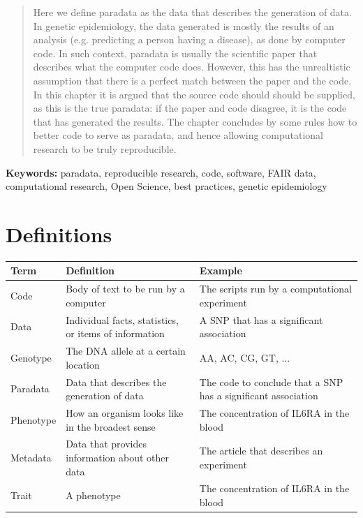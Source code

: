 \begin{abstract}

Here we define paradata as the data that describes the generation of data.
In genetic epidemiology, the data generated is mostly the results 
of an analysis (e.g. predicting a person having a disease),
as done by computer code.
In such context, paradata is usually the scientific paper that
describes what the computer code does.
However, this has the unrealtistic 
assumption that there is a perfect match between the paper and the code.
In this chapter it is argued that the source code should should be supplied,
as this is the true paradata: if the paper and code disagree, it is the
code that has generated the results.
The chapter concludes by some rules how to better code to serve as paradata,
and hence allowing computational research to be truly reproducible.

\end{abstract}

{\bf Keywords:} paradata, reproducible research, code, software,
FAIR data, computational research, Open Science, best practices,
genetic epidemiology

\section*{Definitions}

\begin{table}[h]
  \begin{tabular}{lp{5cm}p{5cm}}
    Term      & Definition                                            & Example                                                         \\
    \hline
    Code      & Body of text to be run by a computer                  & The scripts run by a computational experiment                   \\
    Data      & Individual facts, statistics, or items of information & A SNP that has a significant association                        \\
    Genotype  & The DNA allele at a certain location                  & AA, AC, CG, GT, ...                                             \\
    Paradata  & Data that describes the generation of data            & The code to conclude that a SNP has a significant association   \\
    Phenotype & How an organism looks like in the broadest sense      & The concentration of IL6RA in the blood                         \\
    Metadata  & Data that provides information about other data       & The article that describes an experiment                        \\
    Trait     & A phenotype                                           & The concentration of IL6RA in the blood                         
  \end{tabular}
\end{table}


